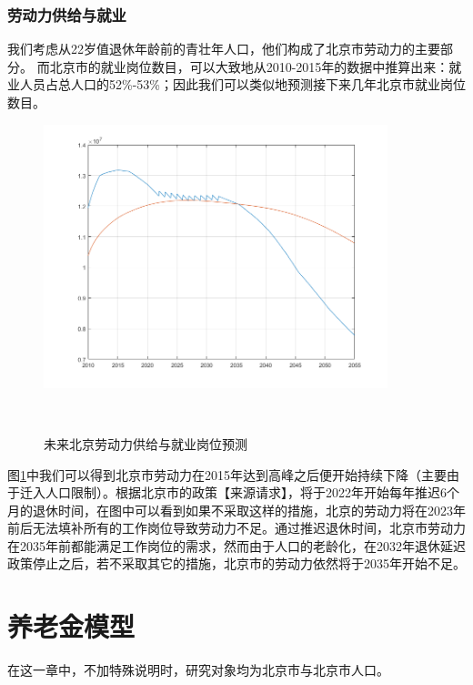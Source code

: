 \documentclass[a4paper]{article}
\begin{document}
\section{劳动力供给与就业}
我们考虑从22岁值退休年龄前的青壮年人口，他们构成了北京市劳动力的主要部分。
而北京市的就业岗位数目，可以大致地从2010-2015年的数据中推算出来：就业人员占总人口的52\%-53\%；因此我们可以类似地预测接下来几年北京市就业岗位数目。
	\begin{figure}[htbp]
		\centering
		\includegraphics[width=10cm]{pics/future_work.png}
		\caption{未来北京劳动力供给与就业岗位预测} 
		 \\
		\label{future_work}	
	\end{figure}
图\ref{future_work}中我们可以得到北京市劳动力在2015年达到高峰之后便开始持续下降（主要由于迁入人口限制）。根据北京市的政策【来源请求】，将于2022年开始每年推迟6个月的退休时间，在图中可以看到如果不采取这样的措施，北京的劳动力将在2023年前后无法填补所有的工作岗位导致劳动力不足。通过推迟退休时间，北京市劳动力在2035年前都能满足工作岗位的需求，然而由于人口的老龄化，在2032年退休延迟政策停止之后，若不采取其它的措施，北京市的劳动力依然将于2035年开始不足。

\part{养老金模型}
在这一章中，不加特殊说明时，研究对象均为北京市与北京市人口。
\end{document}
